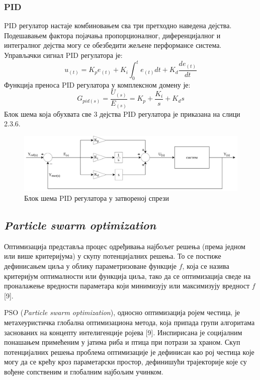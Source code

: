 \documentclass[12pt]{article}
\begin{document}
\subsubsection{PID}
PID регулатор настаје комбиновањем сва три претходно наведена дејства. Подешавањем фактора појачања пропорционалног, диференцијалног и интегралног дејства могу се обезбедити жељене перформансе система.
Управљачки сигнал PID регулатора је:
\begin{equation}
    u_{(t)} = K_p e_{(t)} + K_i\int_{0}^{t}e_{(t)}dt + K_d\dfrac{de_{(t)}}{dt}
\end{equation}
Функција преноса PID регулатора у комплексном домену је:
\begin{equation}
    G_{pid(s)} = \dfrac{U_{(s)}}{E_{(s)}} = K_p + \dfrac{K_i}{s} + K_ds
\end{equation}
Блок шема која обухвата све 3 дејства PID регулатора је приказана на слици 2.3.6.
\begin{figure}[H]
    \centering
    \includegraphics[width=18cm]{figures/pid.drawio.png}
    \caption{Блок шема PID регулатора у затвореној спрези}
    \label{fig:PID_затворена_спрега}
\end{figure}

\subsection{\textit{Particle swarm optimization}}
Оптимизација представља процес одређивања најбољег решења (према једном или више критеријума) у скупу потенцијалних решења. То се постиже дефинисањем циља у облику параметризоване функције $f$, која се назива критеријум оптималности или функција циља, тако да се оптимизација сведе на проналажење вредности параметара који минимизују или максимизују вредност $f$ [9].

PSO (\textit{Particle swarm optimization}), односно оптимизација ројем честица, је метахеуристичка глобална оптимизациона метода, која припада групи алгоритама заснованих на концепту интелигенције ројева [9]. Инспирисана је социјалним понашањем примећеним у јатима риба и птица при потрази за храном. Скуп потенцијалних решења проблема оптимизације је дефинисан као рој честица које могу да се крећу кроз параметарски простор, дефинишући трајекторије које су вођене сопственим и глобалним најбољим учинком.
\end{document}
